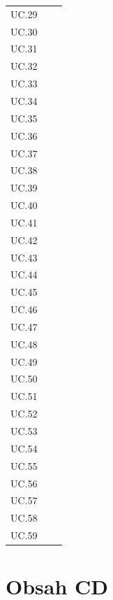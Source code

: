 \documentclass[czech,BP]{thesiskiv}
\begin{document}
{\begin{table}[]
\begin{tabular}{lll}
		UC.29	&       &    \\
		UC.30	&       &    \\
		UC.31	&       &    \\
		UC.32	&       &    \\
		UC.33	&       &    \\
		UC.34	&       &    \\
		UC.35	&       &    \\
		UC.36	&       &    \\
		UC.37	&       &    \\
		UC.38	&       &    \\
		UC.39	&       &    \\
		UC.40	&       &    \\
		UC.41	&       &    \\
		UC.42	&       &    \\
		UC.43	&       &    \\
		UC.44	&       &    \\
		UC.45	&       &    \\
		UC.46	&       &    \\
		UC.47	&       &    \\
		UC.48	&       &    \\
		UC.49	&       &    \\
		UC.50	&       &    \\
		UC.51	&       &    \\
		UC.52	&       &    \\
		UC.53	&       &    \\
		UC.54	&       &    \\
		UC.55	&       &    \\
		UC.56	&       &    \\
		UC.57	&       &    \\
		UC.58	&       &    \\
		UC.59	&       &    \\
	\end{tabular}
\end{table}
\chapter{Obsah CD}
}
\end{document}
